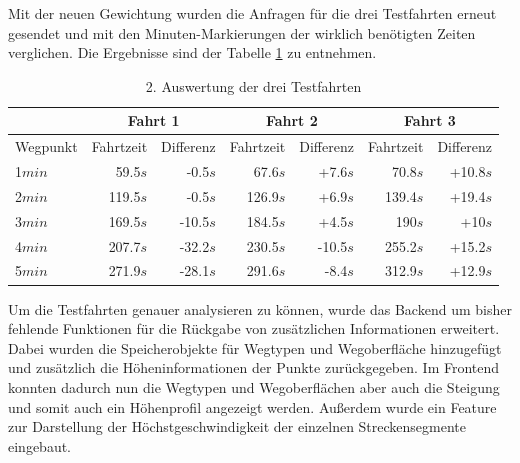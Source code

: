 Mit der neuen Gewichtung wurden die Anfragen für die drei Testfahrten erneut gesendet und mit den Minuten-Markierungen der wirklich benötigten Zeiten verglichen.
Die Ergebnisse sind der Tabelle \ref{tab:all} zu entnehmen.

\begin{table}[htb]
\centering
\caption{2. Auswertung der drei Testfahrten}
\label{tab:all}
\begin{tabular}{|l|r|r|r|r|r|r|}
\hhline{~|-|-|-|-|-|-}
\multicolumn{1}{l|}{} & \multicolumn{2}{c|}{Fahrt 1} & \multicolumn{2}{c|}{Fahrt 2} & \multicolumn{2}{c|}{Fahrt 3} \\ \hline
Wegpunkt              & Fahrtzeit   & Differenz     & Fahrtzeit   & Differenz     & Fahrtzeit  & Differenz      \\ \hline 
1$min$                & 59.5$s$     & -0.5$s$        & 67.6$s$     & +7.6$s$        & 70.8$s$    & +10.8$s$        \\
2$min$                & 119.5$s$    & -0.5$s$        & 126.9$s$    & +6.9$s$        & 139.4$s$   & +19.4$s$        \\
3$min$                & 169.5$s$    & -10.5$s$       & 184.5$s$    & +4.5$s$        & 190$s$     & +10$s$          \\
4$min$                & 207.7$s$    & -32.2$s$       & 230.5$s$    & -10.5$s$       & 255.2$s$   & +15.2$s$        \\
5$min$                & 271.9$s$    & -28.1$s$       & 291.6$s$    & -8.4$s$        & 312.9$s$   & +12.9$s$        \\
\hline
\end{tabular}
\end{table}


Um die Testfahrten genauer analysieren zu können, wurde das Backend um bisher fehlende Funktionen für die Rückgabe von zusätzlichen Informationen erweitert.
Dabei wurden die Speicherobjekte für Wegtypen und Wegoberfläche hinzugefügt und zusätzlich die Höheninformationen der Punkte zurückgegeben.
Im Frontend konnten dadurch nun die Wegtypen und Wegoberflächen aber auch die Steigung und somit auch ein Höhenprofil angezeigt werden.
Außerdem wurde ein Feature zur Darstellung der Höchstgeschwindigkeit der einzelnen Streckensegmente eingebaut.